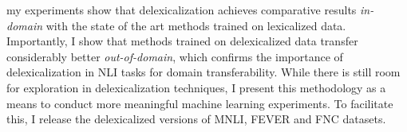 \documentclass[compsoc,onecolumn]{IEEEtran}
\begin{document}
my experiments show that delexicalization achieves comparative results {\em in-domain} with the state of the art methods trained on lexicalized data. Importantly, I show that methods trained on delexicalized data transfer considerably better {\em out-of-domain}, which  confirms the importance of delexicalization in NLI tasks for domain transferability. While there is still room for exploration in delexicalization techniques, I present this methodology as a means  to conduct more meaningful machine learning experiments. To facilitate this, I release the delexicalized versions of MNLI, FEVER and FNC datasets.





\balance
\begin{spacing}{0.88}
%


\end{spacing}

\end{document}
